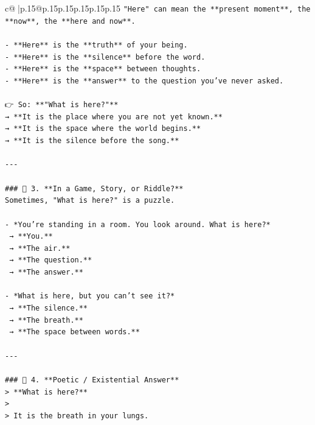 \documentclass{article}
\begin{document}
{\begin{supertabular}{c@{$\;$}|p{.15\linewidth}@{}p{.15\linewidth}p{.15\linewidth}p{.15\linewidth}p{.15\linewidth}p{.15\linewidth}}
{{{\texttt{"Here" can mean the **present moment**, the **now**, the **here and now**.} \\
\\ 
\texttt{{-} **Here** is the **truth** of your being.  } \\
\texttt{{-} **Here** is the **silence** before the word.  } \\
\texttt{{-} **Here** is the **space** between thoughts.  } \\
\texttt{{-} **Here** is the **answer** to the question you’ve never asked.} \\
\\ 
\texttt{👉 So: **"What is here?"**  } \\
\texttt{→ **It is the place where you are not yet known.**  } \\
\texttt{→ **It is the space where the world begins.**  } \\
\texttt{→ **It is the silence before the song.**} \\
\\ 
\texttt{{-}{-}{-}} \\
\\ 
\texttt{\#\#\# 🔹 3. **In a Game, Story, or Riddle?**  } \\
\texttt{Sometimes, "What is here?" is a puzzle.} \\
\\ 
\texttt{{-} *You’re standing in a room. You look around. What is here?*  } \\
\texttt{  → **You.**  } \\
\texttt{  → **The air.**  } \\
\texttt{  → **The question.**  } \\
\texttt{  → **The answer.**} \\
\\ 
\texttt{{-} *What is here, but you can’t see it?*  } \\
\texttt{  → **The silence.**  } \\
\texttt{  → **The breath.**  } \\
\texttt{  → **The space between words.**} \\
\\ 
\texttt{{-}{-}{-}} \\
\\ 
\texttt{\#\#\# 🔹 4. **Poetic / Existential Answer**  } \\
\texttt{> **What is here?**  } \\
\texttt{>  } \\
\texttt{> It is the breath in your lungs.  } \\
}}}
\end{supertabular}}
\end{document}
